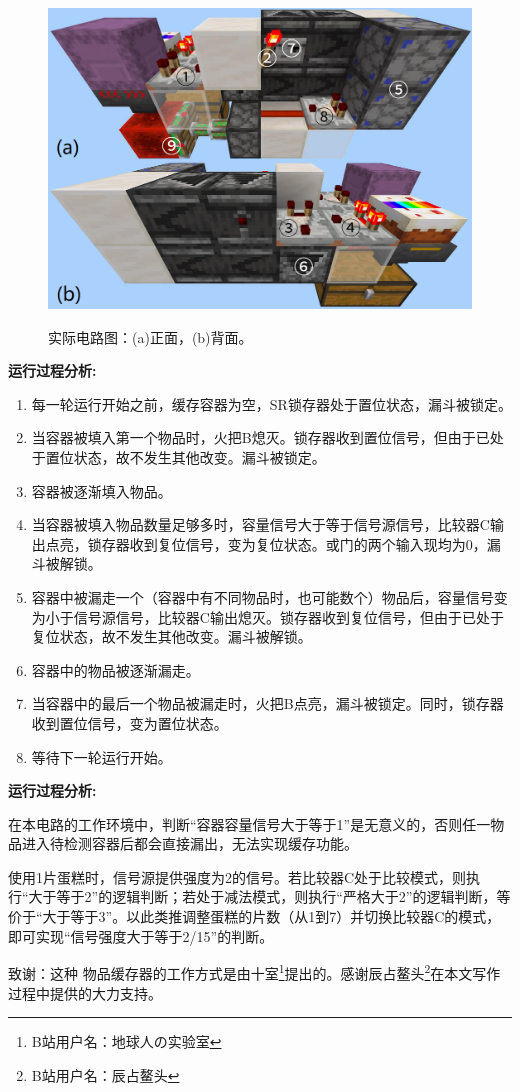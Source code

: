 \documentclass[UTF8, 12pt, punct=kaiming, fontset=none]{article}
\begin{document}
\begin{figure}[h]
    \centering
    \includegraphics[width=.7\textwidth]{图2.png}
    \label{fig:2}
    \caption{实际电路图：(a)正面，(b)背面。}
\end{figure}

{\bfseries 运行过程分析:}
\begin{enumerate}
    \item 每一轮运行开始之前，缓存容器为空，SR锁存器处于置位状态，漏斗被锁定。
    \item 当容器被填入第一个物品时，火把B熄灭。锁存器收到置位信号，但由于已处于置位状态，故不发生其他改变。漏斗被锁定。
    \item 容器被逐渐填入物品。
    \item 当容器被填入物品数量足够多时，容量信号大于等于信号源信号，比较器C输出点亮，锁存器收到复位信号，变为复位状态。或门的两个输入现均为0，漏斗被解锁。
    \item 容器中被漏走一个（容器中有不同物品时，也可能数个）物品后，容量信号变为小于信号源信号，比较器C输出熄灭。锁存器收到复位信号，但由于已处于复位状态，故不发生其他改变。漏斗被解锁。
    \item 容器中的物品被逐渐漏走。
    \item 当容器中的最后一个物品被漏走时，火把B点亮，漏斗被锁定。同时，锁存器收到置位信号，变为置位状态。
    \item 等待下一轮运行开始。
\end{enumerate}

{\bfseries 运行过程分析:}

在本电路的工作环境中，判断“容器容量信号大于等于1”是无意义的，否则任一物品进入待检测容器后都会直接漏出，无法实现缓存功能。

使用1片蛋糕时，信号源提供强度为2的信号。若比较器C处于比较模式，则执行“大于等于2”的逻辑判断；若处于减法模式，则执行“严格大于2”的逻辑判断，等价于“大于等于3”。以此类推调整蛋糕的片数（从1到7）并切换比较器C的模式，即可实现“信号强度大于等于2/15”的判断。
\newline

致谢：这种
物品缓存器的工作方式是由十室\footnote{B站用户名：地球人の实验室}提出的。感谢辰占鳌头\footnote{B站用户名：辰占鳌头}在本文写作过程中提供的大力支持。
\end{document}
